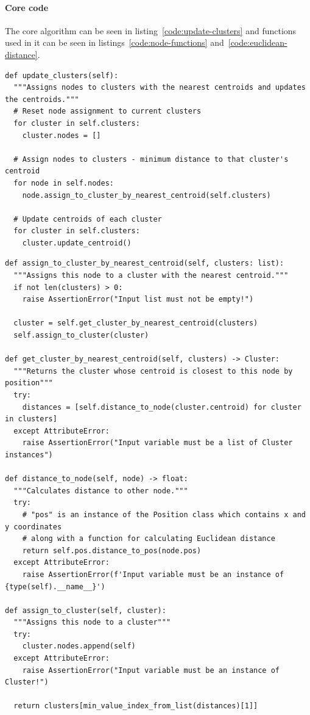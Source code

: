 \documentclass[a4paper]{article}
\newcommand{\code}{\texttt}
\begin{document}
\paragraph{Core code} The core algorithm can be seen in listing~\ref{code:update-clusters} and functions used in it can be seen in listings~\ref{code:node-functions} and~\ref{code:euclidean-distance}.

\begin{lstlisting}[caption={Core function of the K-Means algorithm - \code{self} refers to the K-Means class.}, label={code:update-clusters}]
def update_clusters(self):
  """Assigns nodes to clusters with the nearest centroids and updates the centroids."""
  # Reset node assignment to current clusters
  for cluster in self.clusters:
    cluster.nodes = []

  # Assign nodes to clusters - minimum distance to that cluster's centroid
  for node in self.nodes:
    node.assign_to_cluster_by_nearest_centroid(self.clusters)

  # Update centroids of each cluster
  for cluster in self.clusters:
    cluster.update_centroid()
\end{lstlisting}

\begin{lstlisting}[caption={Functions of the \code{Node} class that are used for deciding what cluster a node will be assigned to.}, label={code:node-functions}]
def assign_to_cluster_by_nearest_centroid(self, clusters: list):
  """Assigns this node to a cluster with the nearest centroid."""
  if not len(clusters) > 0:
    raise AssertionError("Input list must not be empty!")

  cluster = self.get_cluster_by_nearest_centroid(clusters)
  self.assign_to_cluster(cluster)

def get_cluster_by_nearest_centroid(self, clusters) -> Cluster:
  """Returns the cluster whose centroid is closest to this node by position"""
  try:
    distances = [self.distance_to_node(cluster.centroid) for cluster in clusters]
  except AttributeError:
    raise AssertionError("Input variable must be a list of Cluster instances")

def distance_to_node(self, node) -> float:
  """Calculates distance to other node."""
  try:
    # "pos" is an instance of the Position class which contains x and y coordinates
    # along with a function for calculating Euclidean distance
    return self.pos.distance_to_pos(node.pos)
  except AttributeError:
    raise AssertionError(f'Input variable must be an instance of {type(self).__name__}')

def assign_to_cluster(self, cluster):
  """Assigns this node to a cluster"""
  try:
    cluster.nodes.append(self)
  except AttributeError:
    raise AssertionError("Input variable must be an instance of Cluster!")

  return clusters[min_value_index_from_list(distances)[1]]
\end{lstlisting}
\end{document}
